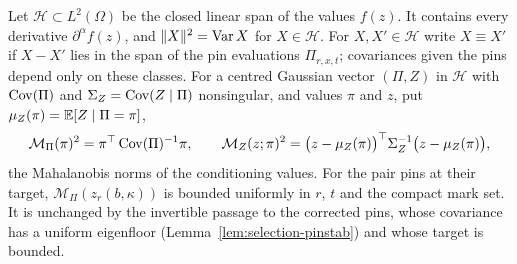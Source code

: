 Let $\mathcal H\subset L^2(\Omega)$ be the closed linear span of the values $f(z)$. It contains every derivative $\partial^\alpha f(z)$, and $\|X\|^2=\operatorname{Var} X$ for $X\in\mathcal H$. For $X,X'\in\mathcal H$ write $X\equiv X'$ if $X-X'$ lies in the span of the pin evaluations $\Pi_{r,x,t}$; covariances given the pins depend only on these classes. For a centred Gaussian vector $(\Pi,Z)$ in $\mathcal H$ with $\operatorname{Cov}(\Pi)$ and $\Sigma_Z=\operatorname{Cov}(Z\mid\Pi)$ nonsingular, and values $\pi$ and $z$, put $\mu_Z(\pi)=\mathbb E[Z\mid\Pi=\pi]$,
\[
\mathcal M_\Pi(\pi)^2=\pi^{\top}\operatorname{Cov}(\Pi)^{-1}\pi,\qquad\mathcal M_Z(z;\pi)^2=\bigl(z-\mu_Z(\pi)\bigr)^{\top}\Sigma_Z^{-1}\bigl(z-\mu_Z(\pi)\bigr),
\]
the Mahalanobis norms of the conditioning values. For the pair pins at their target, $\mathcal M_\Pi(z_r(b,\kappa))$ is bounded uniformly in $r$, $t$ and the compact mark set. It is unchanged by the invertible passage to the corrected pins, whose covariance has a uniform eigenfloor (Lemma~\ref{lem:selection-pinstab}) and whose target is bounded.

